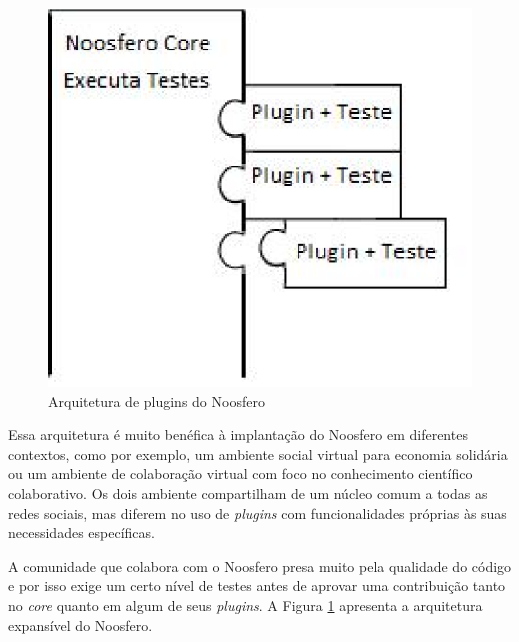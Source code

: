 \begin{figure}
	\centering
	\label{plugins}
		\includegraphics[keepaspectratio=true,scale=0.6]{figuras/plugins.eps}
	\caption{Arquitetura de plugins do Noosfero}
\end{figure}

Essa arquitetura é muito benéfica à implantação do Noosfero em diferentes
contextos, como por exemplo, um ambiente social virtual para economia
solidária ou um ambiente de colaboração virtual com foco no conhecimento
científico colaborativo. Os dois ambiente compartilham de um núcleo
comum a todas as redes sociais, mas diferem no uso de \textit{plugins}
com funcionalidades próprias às suas necessidades específicas.

A comunidade que colabora com o Noosfero presa muito pela qualidade
do código e por isso exige um certo nível de testes antes de aprovar
uma contribuição tanto no \textit{core} quanto em algum de seus
\textit{plugins}. A Figura \ref{plugins} apresenta a arquitetura
expansível do Noosfero.

